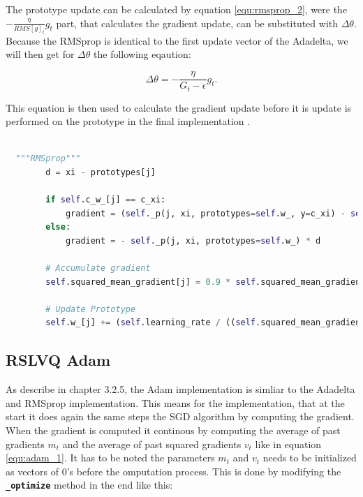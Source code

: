 \documentclass[12pt,oneside,a4paper,parskip]{scrbook}
\begin{document}
The prototype update can be calculated by equation \ref{equ:rmsprop_2}, were the $-\frac{\eta}{RMS[\textit{g}]_t} g_t$ 
part, that calculates the gradient update, can be substituted with $\Delta\theta$.
Because the RMSprop is identical to the first update vector of the Adadelta, we will then get for $\Delta\theta$ the following 
eqaution:

\begin{equation}
  \Delta\theta = - \frac{\eta}{G_t-\epsilon} \textit{g}_\textit{t}.
\end{equation}

This equation is then used to calculate the gradient update before it is update is performed on the prototype in the 
final implementation \cite{PassiveDriftonRSLVQ}.

\begin{lstlisting}[label=lst:rmsprop,
  language=python,
  firstnumber=1,
  caption= Implementation of the RMSprop from \cite{PassiveDriftonRSLVQ}.]			   

  """RMSprop"""
        d = xi - prototypes[j]
                
        if self.c_w_[j] == c_xi:
            gradient = (self._p(j, xi, prototypes=self.w_, y=c_xi) - self._p(j, xi, prototypes=self.w_)) * d
        else:
            gradient = - self._p(j, xi, prototypes=self.w_) * d
            
        # Accumulate gradient
        self.squared_mean_gradient[j] = 0.9 * self.squared_mean_gradient[j] + 0.1 * gradient ** 2
        
        # Update Prototype
        self.w_[j] += (self.learning_rate / ((self.squared_mean_gradient[j] + self.epsilon) ** 0.5)) * gradient
\end{lstlisting}

\subsection{RSLVQ Adam}

As describe in chapter 3.2.5, the Adam implementation is simliar to the Adadelta and RMSprop implementation.
This means for the implementation, that at the start it does again the same steps the SGD algorithm by computing the gradient.
When the gradient is computed it continous by computing the average  of  past  gradients $m_t$ and the average  of  past  squared  gradients $v_t$
like in equation \ref{equ:adam_1}. It has to be noted the parameters $m_t$ and $v_t$ needs to be initialized as vectors of 0's before
the omputation process. This is done by modifying the \textbf{\texttt{\_optimize}} method in the end like this:
\end{document}
